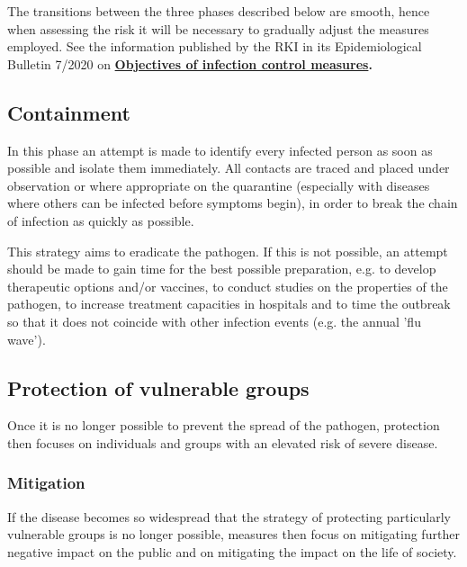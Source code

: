 \documentclass{article}
\begin{document}
The transitions between the three phases described below are smooth, hence when assessing the risk it will be necessary to gradually adjust the measures employed. See the information published by the RKI in its Epidemiological Bulletin 7/2020 on \textbf{\href{https://www.rki.de/DE/Content/Infekt/EpidBull/Archiv/2020/Ausgaben/07_20.pdf}{Objectives of infection control measures}}\textbf{.}


\subsection{Containment}\label{H5112706}



In this phase an attempt is made to identify every infected person as soon as possible and isolate them immediately. All contacts are traced and placed under observation or where appropriate on the quarantine (especially with diseases where others can be infected before symptoms begin), in order to break the chain of infection as quickly as possible.


This strategy aims to eradicate the pathogen. If this is not possible, an attempt should be made to gain time for the best possible preparation, e.g. to develop therapeutic options and/or vaccines, to conduct studies on the properties of the pathogen, to increase treatment capacities in hospitals and to time the outbreak so that it does not coincide with other infection events (e.g. the annual 'flu wave').


\subsection{Protection of vulnerable groups}\label{H7478921}



Once it is no longer possible to prevent the spread of the pathogen, protection then focuses on individuals and groups with an elevated risk of severe disease.


\subsubsection{Mitigation}\label{H792762}



If the disease becomes so widespread that the strategy of protecting particularly vulnerable groups is no longer possible, measures then focus on mitigating further negative impact on the public and on mitigating the impact on the life of society.
\end{document}
